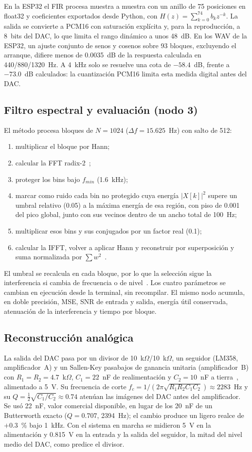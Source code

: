 \documentclass[conference]{IEEEtran}
\begin{document}
En la ESP32 el FIR procesa muestra a muestra con un anillo de 75 posiciones en float32
y coeficientes exportados desde Python, con $H(z)=\sum_{k=0}^{74}b_kz^{-k}$.
La salida se convierte a PCM16 con saturación
explícita y, para la reproducción, a 8~bits del DAC, lo que limita el rango dinámico a
unos 48~dB. En los WAV de la ESP32, un ajuste conjunto de senos y cosenos sobre 93
bloques, excluyendo el arranque, difiere menos de 0.0035~dB de la respuesta calculada
en 440/880/1320~Hz. A 4~kHz solo se resuelve una cota de $-58.4$~dB, frente a
$-73.0$~dB calculados: la cuantización PCM16 limita esta medida digital antes del DAC.

\subsection{Filtro espectral y evaluación (nodo 3)}
El método procesa bloques de $N=1024$ ($\Delta f=15.625$~Hz) con salto de 512:
\begin{enumerate}
\item multiplicar el bloque por Hann;
\item calcular la FFT radix-2~\cite{cooley1965};
\item proteger los bins bajo $f_{min}$ (1.6~kHz);
\item marcar como ruido cada bin no protegido cuya energía $|X[k]|^2$ supere un umbral
relativo (0.05) a la máxima energía de esa región, con piso de 0.001 del pico global,
junto con sus vecinos dentro de un
ancho total de 100~Hz;
\item multiplicar esos bins y sus conjugados por un factor real (0.1);
\item calcular la IFFT, volver a aplicar Hann y reconstruir por superposición y suma
normalizada por $\sum w^2$~\cite{allen1977}.
\end{enumerate}
El umbral se recalcula en cada bloque, por lo que la selección sigue la interferencia
si cambia de frecuencia o de nivel~\cite{boll1979}. Los cuatro parámetros se cambian en
ejecución desde la terminal, sin recompilar. El mismo nodo acumula, en doble precisión,
MSE, SNR de entrada y salida, energía útil conservada, atenuación de la interferencia y
tiempo por bloque.

\subsection{Reconstrucción analógica}
La salida del DAC pasa por un divisor de 10~k$\Omega$/10~k$\Omega$, un seguidor (LM358,
amplificador~A) y un Sallen-Key pasabajos de ganancia unitaria (amplificador~B) con
$R_1=R_2=4.7$~k$\Omega$, $C_1=22$~nF de realimentación y $C_2=10$~nF a
tierra~\cite{sallen1955,sloa024,lm358}, alimentado a 5~V. Su frecuencia de corte
$f_c=1/(2\pi\sqrt{R_1R_2C_1C_2})\approx2283$~Hz y su $Q=\tfrac12\sqrt{C_1/C_2}\approx0.74$
atenúan las imágenes del DAC antes del amplificador. Se usó 22~nF, valor comercial
disponible, en lugar de los 20~nF de un Butterworth exacto ($Q=0.707$, 2394~Hz); el
cambio produce un ligero realce de $+0.3$~\% bajo 1~kHz. Con el sistema en marcha se
midieron 5~V en la alimentación y 0.815~V en la entrada y la salida del seguidor, la
mitad del nivel medio del DAC, como predice el divisor.
\end{document}
